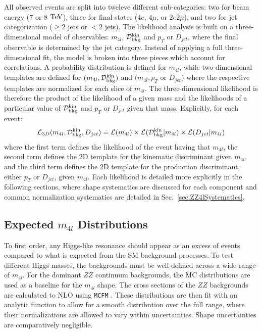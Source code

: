 All observed events are split into tweleve different sub-categories: two for beam energy ($7$ or $8$ $\rm{TeV}$), three for final states ($4e$, $4\mu$, or $2e2\mu$), and two for jet categorization ($\geq2$ jets or $<2$ jets). The likelihood analysis is built on a three-dimensional model of observables: $m_{4l}$, $\mathcal{D}_{\rm{bkg}}^{\rm{kin}}$ and $p_T$ or $D_{jet}$, where the final observable is determined by the jet category. Instead of applying a full three-dimensional fit, the model is broken into three pieces which account for correlations. A probability distribution is defined for $m_{4l}$, while two-dimensional templates are defined for $(m_{4l},\mathcal{D}_{\rm{bkg}}^{\rm{kin}})$ and $(m_{4l},p_T$ or $D_{jet})$ where the respective templates are normalized for each slice of $m_{4l}$. The three-dimensional likelihood is therefore the product of the likelihood of a given mass and the likelihoods of a particular value of $\mathcal{D}_{\rm{bkg}}^{\rm{kin}}$ and $p_T$ or $D_{jet}$ given that mass. Explicitly, for each event:
\begin{equation}
\label{eqn:likelihoodXS}
\mathcal{L}_{3D}(m_{4l},\mathcal{D}_{\rm{bkg}}^{\rm{kin}},D_{jet})=\mathcal{L}(m_{4l}) \times \mathcal{L}(\mathcal{D}_{\rm{bkg}}^{\rm{kin}}|m_{4l}) \times \mathcal{L}(D_{jet}|m_{4l})
\end{equation}
where the first term defines the likelihood of the event having that $m_{4l}$, the second term defines the 2D template for the kinematic discriminant given $m_{4l}$, and the third term defines the 2D template for the production discriminant, either $p_T$ or $D_{jet}$, given $m_{4l}$. Each likelihood is detailed more explicitly in the following sections, where shape systematics are discussed for each component and common normalization systematics are detailed in Sec.~\ref{sec:ZZ4lSystematics}.

\subsection{Expected $m_{4l}$ Distributions}
\label{sec:ZZ4lMassShape}

To first order, any Higgs-like resonance should appear as an excess of events compared to what is expected from the SM background processes. To test different Higgs masses, the backgrounds must be well-defined across a wide range of $m_{4l}$. For the dominant $ZZ$ continuum backgrounds, the MC distributions are used as a baseline for the $m_{4l}$ shape. The cross sections of the $ZZ$ backgrounds are calculated to NLO using {\tt MCFM} \cite{MCFM,Campbell:1999ah,Campbell:2011bn}. These distributions are then fit with an analytic function to allow for a smooth distribution over the full range, where their normalizations are allowed to vary within uncertainties. Shape uncertainties are comparatively negligible.

